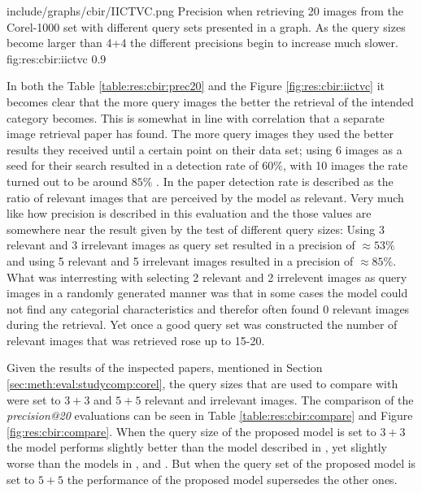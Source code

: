 \singlefigurenear
{include/graphs/cbir/IICTVC.png}
{Precision when retrieving 20 images from the Corel-1000 set with different query sets presented in a graph. As the query sizes become larger than 4+4 the different precisions begin to increase much slower.}
{fig:res:cbir:iictvc}
{0.9}

In both the Table \ref{table:res:cbir:prec20} and the Figure \ref{fig:res:cbir:iictvc} it becomes clear that the more query images the better the retrieval of the intended category becomes. This is somewhat in line with correlation that a separate image retrieval paper has found. The more query images they used the better results they received until a certain point on their data set; using 6 images as a seed for their search resulted in a detection rate of $60\%$, with 10 images the rate turned out to be around $85\%$ \cite{li2010optimol}. In the paper detection rate is described as the ratio of relevant images that are perceived by the model as relevant. Very much like how precision is described in this evaluation and the those values are somewhere near the result given by the test of different query sizes: Using 3 relevant and 3 irrelevant images as query set resulted in a precision of $\approx53\%$ and using 5 relevant and 5 irrelevant images resulted in a precision of $\approx85\%$. What was interresting with selecting 2 relevant and 2 irrelevent images as query images in a randomly generated manner was that in some cases the model could not find any categorial characteristics and therefor often found 0 relevant images during the retrieval. Yet once a good query set was constructed the number of relevant images that was retrieved rose up to 15-20. 



Given the results of the inspected papers, mentioned in Section \ref{sec:meth:eval:studycomp:corel}, the query sizes that are used to compare with were set to $3+3$ and $5+5$ relevant and irrelevant images. The comparison of the \emph{precision@20} evaluations can be seen in Table \ref{table:res:cbir:compare} and Figure \ref{fig:res:cbir:compare}. When the query size of the proposed model is set to $3+3$ the model performs slightly better than the model described in \cite{wang2001simplicity}, yet slightly worse than the models in \cite{subrahmanyam2013modified}, \cite{nagaraja2015low} and \cite{elalami2014new}. But when the query set of the proposed model is set to $5+5$ the performance of the proposed model supersedes the other ones. 


